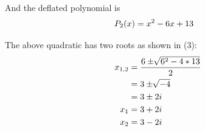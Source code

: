\begin{exercise}{3}
And the deflated polynomial is
\begin{align}
P_2(x) &= x^2 - 6x + 13 \notag 
\end{align}



The above quadratic has two roots as shown in (3): 
\begin{align}
x_{1,2} &= \frac{6 \pm \sqrt[]{6^2-4*13}}{2} \notag \\
&=3 \pm \sqrt[]{-4} \notag \\
&= 3 \pm 2i \notag \\
x_1 &= 3 + 2i \notag \\
x_2 &= 3 - 2i \notag
\end{align}
\end{exercise}
 

